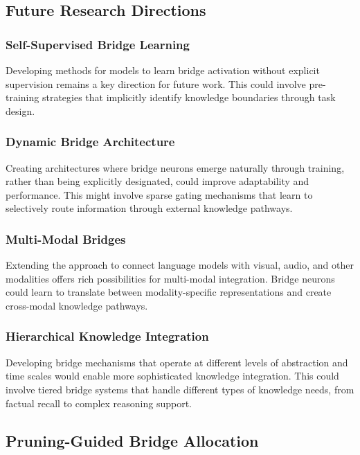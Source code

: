 \documentclass[9pt,a4paper,twocolumn,twoside]{tau-class/tau}
\begin{document}
\subsection{Future Research Directions}

\subsubsection{Self-Supervised Bridge Learning}

    Developing methods for models to learn bridge activation without explicit supervision remains a key direction for future work. This could involve pre-training strategies that implicitly identify knowledge boundaries through task design.

\subsubsection{Dynamic Bridge Architecture}

    Creating architectures where bridge neurons emerge naturally through training, rather than being explicitly designated, could improve adaptability and performance. This might involve sparse gating mechanisms that learn to selectively route information through external knowledge pathways.

\subsubsection{Multi-Modal Bridges}

    Extending the approach to connect language models with visual, audio, and other modalities offers rich possibilities for multi-modal integration. Bridge neurons could learn to translate between modality-specific representations and create cross-modal knowledge pathways.

\subsubsection{Hierarchical Knowledge Integration}

    Developing bridge mechanisms that operate at different levels of abstraction and time scales would enable more sophisticated knowledge integration. This could involve tiered bridge systems that handle different types of knowledge needs, from factual recall to complex reasoning support.

\subsection{Pruning-Guided Bridge Allocation}
\end{document}
